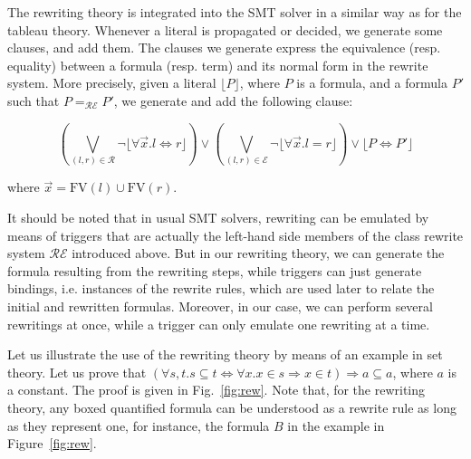 The rewriting theory is integrated into the SMT solver in a similar way as for
the tableau theory. Whenever a literal is propagated or decided, we generate some clauses,
and add them. The clauses we generate
express the equivalence (resp. equality) between a formula (resp. term) and its normal form
in the rewrite system. More precisely, given a literal
$\lfloor{}P\rfloor$, where $P$ is a formula, and a formula $P'$ such that
$P=_\mathcal{RE}P'$, we generate and add the following clause:

$$\left(\bigvee_{(l,r)\in\mathcal{R}}
\neg\lfloor\forall{}\vec{x}.l\Leftrightarrow{}r\rfloor\right)\lor
\left(\bigvee_{(l,r)\in\mathcal{E}}\neg\lfloor\forall{}\vec{x}.l=r\rfloor\right)\lor
\lfloor{}P\Leftrightarrow{}P'\rfloor$$

where $\vec{x}=\mathrm{FV}(l)\cup\mathrm{FV}(r)$.

It should be noted that in usual SMT solvers, rewriting can be emulated by means
of triggers that are actually the left-hand side members of the class rewrite
system $\mathcal{RE}$ introduced above. But in our rewriting theory, we can
generate the formula resulting from the rewriting steps, while triggers can just
generate bindings, i.e. instances of the rewrite rules, which are used later to
relate the initial and rewritten formulas. Moreover, in our case, we can perform
several rewritings at once, while a trigger can only emulate one rewriting at a
time.

Let us illustrate the use of the rewriting theory by means of an example in set
theory. Let us prove that
$(\forall{}s,t.s\subseteq{}t\Leftrightarrow{}\forall{}x.x\in{}s\Rightarrow{}
x\in{}t) \Rightarrow{} {}a\subseteq{}a$, where $a$ is a constant. The proof is
given in Fig.~\ref{fig:rew}.
Note that, for the rewriting theory, any boxed quantified formula can be understood as
a rewrite rule as long as they represent one, for instance, the formula $B$ in
the example in Figure~\ref{fig:rew}.

